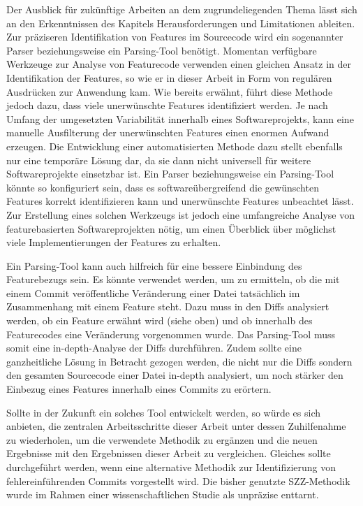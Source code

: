 Der Ausblick für zukünftige Arbeiten an dem zugrundeliegenden Thema lässt sich an den Erkenntnissen des Kapitels \glqq Herausforderungen und Limitationen\grqq{} ableiten.
Zur präziseren Identifikation von Features im Sourcecode wird ein sogenannter \glqq Parser\grqq{} beziehungsweise ein \glqq Parsing-Tool\grqq{} benötigt. Momentan verfügbare Werkzeuge zur Analyse von Featurecode verwenden einen gleichen Ansatz in der Identifikation der Features, so wie er in dieser Arbeit in Form von regulären Ausdrücken zur Anwendung kam. Wie bereits erwähnt, führt diese Methode jedoch dazu, dass viele unerwünschte Features identifiziert werden. Je nach Umfang der umgesetzten Variabilität innerhalb eines Softwareprojekts, kann eine manuelle Ausfilterung der unerwünschten Features einen enormen Aufwand erzeugen. Die Entwicklung einer automatisierten Methode dazu stellt ebenfalls nur eine temporäre Lösung dar, da sie dann nicht universell für weitere Softwareprojekte einsetzbar ist. Ein Parser beziehungsweise ein Parsing-Tool könnte so konfiguriert sein, dass es softwareübergreifend die gewünschten Features korrekt identifizieren kann und unerwünschte Features unbeachtet lässt. Zur Erstellung eines solchen Werkzeugs ist jedoch eine umfangreiche Analyse von featurebasierten Softwareprojekten nötig, um einen Überblick über möglichst viele Implementierungen der Features zu erhalten.

Ein Parsing-Tool kann auch hilfreich für eine bessere Einbindung des Featurebezugs sein. Es könnte verwendet werden, um zu ermitteln, ob die mit einem Commit veröffentliche Veränderung einer Datei tatsächlich im Zusammenhang mit einem Feature steht. Dazu muss in den Diffs analysiert werden, ob ein Feature erwähnt wird (siehe oben) und ob innerhalb des Featurecodes eine Veränderung vorgenommen wurde. Das Parsing-Tool muss somit eine \glqq in-depth\grqq -Analyse der Diffs durchführen. Zudem sollte eine ganzheitliche Lösung in Betracht gezogen werden, die nicht nur die Diffs sondern den gesamten Sourcecode einer Datei \glqq in-depth\grqq{} analysiert, um noch stärker den Einbezug eines Features innerhalb eines Commits zu erörtern.

Sollte in der Zukunft ein solches Tool entwickelt werden, so würde es sich anbieten, die zentralen Arbeitsschritte dieser Arbeit unter dessen Zuhilfenahme zu wiederholen, um die verwendete Methodik zu ergänzen und die neuen Ergebnisse mit den Ergebnissen dieser Arbeit zu vergleichen. Gleiches sollte durchgeführt werden, wenn eine alternative Methodik zur Identifizierung von fehlereinführenden Commits vorgestellt wird. Die bisher genutzte SZZ-Methodik wurde im Rahmen einer wissenschaftlichen Studie als unpräzise \glqq enttarnt\grqq.

\cleardoublepage